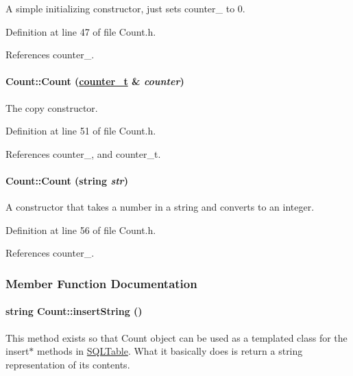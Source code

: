 A simple initializing constructor, just sets counter\_\- to 0. 

Definition at line 47 of file Count.h.

References counter\_\-.\hypertarget{classCount_Counta1}{
\paragraph[Count]{\setlength{\rightskip}{0pt plus 5cm}Count::Count (\hyperlink{Count_8h_a0}{counter\_\-t} \& {\em counter})}\hfill}
\label{classCount_Counta1}


The copy constructor. 

Definition at line 51 of file Count.h.

References counter\_\-, and counter\_\-t.\hypertarget{classCount_Counta2}{
\paragraph[Count]{\setlength{\rightskip}{0pt plus 5cm}Count::Count (string {\em str})}\hfill}
\label{classCount_Counta2}


A constructor that takes a number in a string and converts to an integer. 

Definition at line 56 of file Count.h.

References counter\_\-.

\subsubsection{Member Function Documentation}
\hypertarget{classCount_Counta7}{
\paragraph[insertString]{\setlength{\rightskip}{0pt plus 5cm}string Count::insert\-String ()}\hfill}
\label{classCount_Counta7}


This method exists so that Count object can be used as a templated class for the insert$\ast$ methods in \hyperlink{classSQLTable}{SQLTable}. What it basically does is return a string representation of its contents. 

